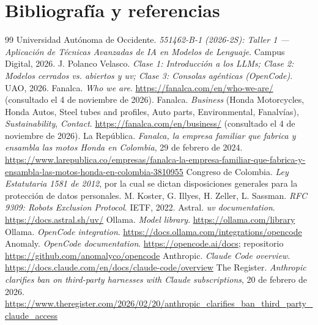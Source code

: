 \chapter{Bibliografía y referencias}\label{cap:bibliografia}
\begingroup
\renewcommand{\chapter}[2]{}%
\begin{thebibliography}{99}\small
{} Universidad Autónoma de Occidente. \emph{551462-B-1 (2026-2S): Taller 1 --- Aplicación de Técnicas Avanzadas de IA en Modelos de Lenguaje}. Campus Digital, 2026.
 J. Polanco Velasco. \emph{Clase 1: Introducción a los LLMs; Clase 2: Modelos cerrados vs. abiertos y uv; Clase 3: Consolas agénticas (OpenCode)}. UAO, 2026.
 Fanalca. \emph{Who we are}. \url{https://fanalca.com/en/who-we-are/} (consultado el 4 de noviembre de 2026).
 Fanalca. \emph{Business} (Honda Motorcycles, Honda Autos, Steel tubes and profiles, Auto parts, Environmental, Fanalvías), \emph{Sustainability}, \emph{Contact}. \url{https://fanalca.com/en/business/} (consultado el 4 de noviembre de 2026).
 La República. \emph{Fanalca, la empresa familiar que fabrica y ensambla las motos Honda en Colombia}, 29 de febrero de 2024. \url{https://www.larepublica.co/empresas/fanalca-la-empresa-familiar-que-fabrica-y-ensambla-las-motos-honda-en-colombia-3810955}
 Congreso de Colombia. \emph{Ley Estatutaria 1581 de 2012}, por la cual se dictan disposiciones generales para la protección de datos personales.
 M. Koster, G. Illyes, H. Zeller, L. Sassman. \emph{RFC 9309: Robots Exclusion Protocol}. IETF, 2022.
 Astral. \emph{uv documentation}. \url{https://docs.astral.sh/uv/}
 Ollama. \emph{Model library}. \url{https://ollama.com/library}
 Ollama. \emph{OpenCode integration}. \url{https://docs.ollama.com/integrations/opencode}
 Anomaly. \emph{OpenCode documentation}. \url{https://opencode.ai/docs}; repositorio \url{https://github.com/anomalyco/opencode}
 Anthropic. \emph{Claude Code overview}. \url{https://docs.claude.com/en/docs/claude-code/overview}
 The Register. \emph{Anthropic clarifies ban on third-party harnesses with Claude subscriptions}, 20 de febrero de 2026. \url{https://www.theregister.com/2026/02/20/anthropic_clarifies_ban_third_party_claude_access}

\end{thebibliography}
